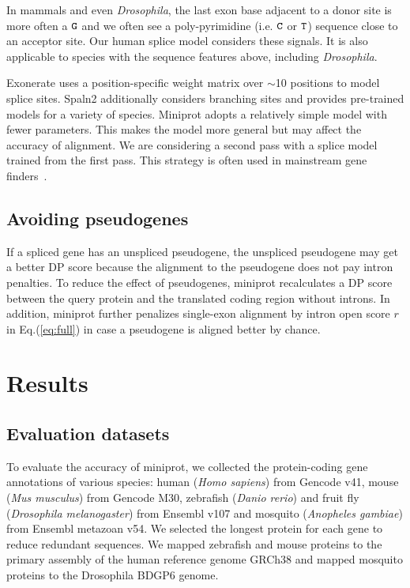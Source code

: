 \documentclass{bioinfo}
\begin{document}
\begin{methods}
In mammals and even \emph{Drosophila}, the last exon base adjacent to a donor site
is more often a ${\tt G}$ and we often see a poly-pyrimidine (i.e. ${\tt C}$ or
${\tt T}$) sequence close to an acceptor site. Our human splice model
considers these signals. It is also applicable to species with the sequence
features above, including \emph{Drosophila}.

Exonerate uses a position-specific weight matrix over $\sim$10 positions to
model splice sites. Spaln2 additionally considers branching sites and provides
pre-trained models for a variety of species. Miniprot adopts a relatively
simple model with fewer parameters. This makes the model more general but may
affect the accuracy of alignment. We are considering a second pass with a
splice model trained from the first pass. This strategy is often used in
mainstream gene finders~\citep{Bruna:2021ug}.

\subsection{Avoiding pseudogenes}

If a spliced gene has an unspliced pseudogene, the unspliced pseudogene may get
a better DP score because the alignment to the pseudogene does not pay intron
penalties. To reduce the effect of pseudogenes, miniprot recalculates a DP
score between the query protein and the translated coding region without
introns. In addition, miniprot further penalizes single-exon alignment by
intron open score $r$ in Eq.(\ref{eq:full}) in case a pseudogene is aligned
better by chance.

\end{methods}

\section{Results}

\subsection{Evaluation datasets}

To evaluate the accuracy of miniprot, we collected the protein-coding gene
annotations of various species: human (\emph{Homo sapiens}) from Gencode v41,
mouse (\emph{Mus musculus}) from Gencode M30, zebrafish (\emph{Danio rerio})
and fruit fly (\emph{Drosophila melanogaster}) from Ensembl v107 and mosquito
(\emph{Anopheles gambiae}) from Ensembl metazoan v54. We selected the longest
protein for each gene to reduce redundant sequences. We mapped zebrafish and
mouse proteins to the primary assembly of the human reference genome GRCh38 and
mapped mosquito proteins to the Drosophila BDGP6 genome.
\end{document}
